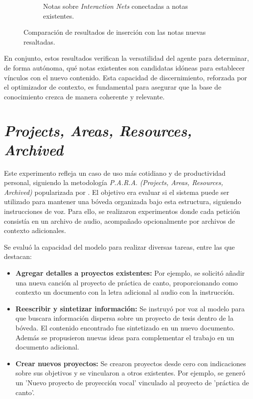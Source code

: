 \begin{figure}[h!]
\begin{subfigure}[b]{0.5\textwidth}
        \caption{Notas sobre \textit{Interaction Nets} conectadas a notas existentes.}
        \label{fig:wiki_connected}
    \end{subfigure}
    \caption{Comparación de resultados de inserción con las notas nuevas resaltadas.}
    \label{fig:wiki_comparison}
\end{figure}

En conjunto, estos resultados verifican la versatilidad del agente para determinar, de forma autónoma, qué notas existentes son candidatas idóneas para establecer vínculos con el nuevo contenido. Esta capacidad de discernimiento, reforzada por el optimizador de contexto, es fundamental para asegurar que la base de conocimiento crezca de manera coherente y relevante.

\section{\textit{Projects, Areas, Resources, Archived}}
Este experimento refleja un caso de uso más cotidiano y de productividad personal, siguiendo la metodología \textit{P.A.R.A}. \textit{(Projects, Areas, Resources, Archived)} popularizada por \cite{forteBuildingSecondBrain2022}. El objetivo era evaluar si el sistema puede ser utilizado para mantener una bóveda organizada bajo esta estructura, siguiendo instrucciones de voz. Para ello, se realizaron experimentos donde cada petición consistía en un archivo de audio, acompañado opcionalmente por archivos de contexto adicionales.

Se evaluó la capacidad del modelo para realizar diversas tareas, entre las que destacan:
\begin{itemize}
    \item \textbf{Agregar detalles a proyectos existentes:} Por ejemplo, se solicitó añadir una nueva canción al proyecto de práctica de canto, proporcionando como contexto un documento con la letra adicional al audio con la instrucción.
    \item \textbf{Reescribir y sintetizar información:} Se instruyó por voz al modelo para que buscara información dispersa sobre un proyecto de tesis dentro de la bóveda. El contenido encontrado fue sintetizado en un nuevo documento. Además se propusieron nuevas ideas para complementar el trabajo en un documento adicional.
    \item \textbf{Crear nuevos proyectos:} Se crearon proyectos desde cero con indicaciones sobre sus objetivos y se vincularon a otros existentes. Por ejemplo, se generó un 'Nuevo proyecto de proyección vocal' vinculado al proyecto de 'práctica de canto'.
\end{itemize}

